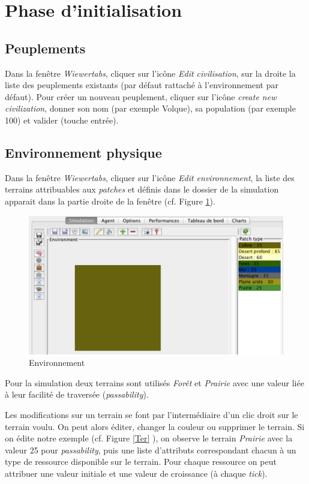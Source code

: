 \section{Phase d'initialisation}
\subsection{Peuplements}
Dans la fenêtre \textit{Wiewertabs}, cliquer sur l'icône \textit{Edit civilisation}, sur la droite la liste des peuplements existants (par défaut  rattaché à l'environnement par défaut).
Pour créer un nouveau peuplement, cliquer sur l'icône \textit{create new civilization},   donner son nom (par exemple Volque), sa population (par exemple 100) et valider (touche entrée).

\subsection{Environnement physique}

Dans la fenêtre \textit{Wiewertabs}, cliquer sur l'icône \textit{Edit environnement}, la liste des terrains attribuables aux \textit{patches} et  définis dans le dossier de la simulation apparait dans la partie droite de la fenêtre (cf. Figure \ref{ENV}).
\begin{figure}[!ht]
	\begin{center}
	\includegraphics[scale=0.4]{DocumentationSimulation/Env.pdf}
	\caption[ENV]{Environnement \\}
	\label{ENV}
	\end{center}
	\end{figure}
	
Pour la simulation deux terrains sont utilisés \textit{Forêt} et \textit{Prairie} avec une valeur liée à leur facilité de traversée (\textit{passability}).

Les modifications sur un terrain se font par l'intermédiaire d'un clic droit sur le terrain voulu.
On peut alors éditer, changer la couleur ou supprimer le terrain.
Si on édite notre exemple (cf. Figure \ref{Ter} ), on observe le terrain \textit{Prairie} avec la valeur 25 pour \textit{passability}, puis une liste d'attributs correspondant chacun à un type de ressource disponible sur le terrain. Pour chaque ressource on peut attribuer une valeur initiale et une valeur de croissance (à chaque\textit{ tick}). 

